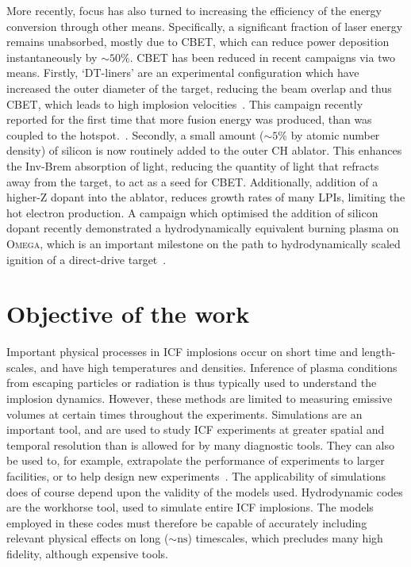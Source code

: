More recently, focus has also turned to increasing the efficiency of the energy conversion through other means.
Specifically, a significant fraction of laser energy remains unabsorbed, mostly due to \ac{CBET}, which can reduce power deposition instantaneously by $\sim50\%$.
\ac{CBET} has been reduced in recent campaigns via two means.
Firstly, `DT-liners' are an experimental configuration which have increased the outer diameter of the target, reducing the beam overlap and thus \ac{CBET}, which leads to high implosion velocities~\cite{williams_high_2021}.
This campaign recently reported for the first time that more fusion energy was produced, than was coupled to the hotspot.~\cite{williams_demonstration_2024}.
Secondly, a small amount ($\sim5\%$ by atomic number density) of silicon is now routinely added to the outer CH ablator.
This enhances the \ac{Inv-Brem} absorption of light, reducing the quantity of light that refracts away from the target, to act as a seed for \ac{CBET}.
Additionally, addition of a higher-Z dopant into the ablator, reduces growth rates of many \ac{LPIs}, limiting the hot electron production.
A campaign which optimised the addition of silicon dopant recently demonstrated a hydrodynamically equivalent burning plasma on \textsc{Omega}, which is an important milestone on the path to hydrodynamically scaled ignition of a direct-drive target~\cite{gopalaswamy_demonstration_2024}.

\section{Objective of the work}%
\label{sec:intro_objective}

Important physical processes in \ac{ICF} implosions occur on short time and length-scales, and have high temperatures and densities.
Inference of plasma conditions from escaping particles or radiation is thus typically used to understand the implosion dynamics.
However, these methods are limited to measuring emissive volumes at certain times throughout the experiments.
Simulations are an important tool, and are used to study \ac{ICF} experiments at greater spatial and temporal resolution than is allowed for by many diagnostic tools.
They can also be used to, for example, extrapolate the performance of experiments to larger facilities, or to help design new experiments~\cite{kritcher_design_2022}.
The applicability of simulations does of course depend upon the validity of the models used.
Hydrodynamic codes are the workhorse tool, used to simulate entire \ac{ICF} implosions.
The models employed in these codes must therefore be capable of accurately including relevant physical effects on long ($\sim\text{ns}$) timescales, which precludes many high fidelity, although expensive tools.


